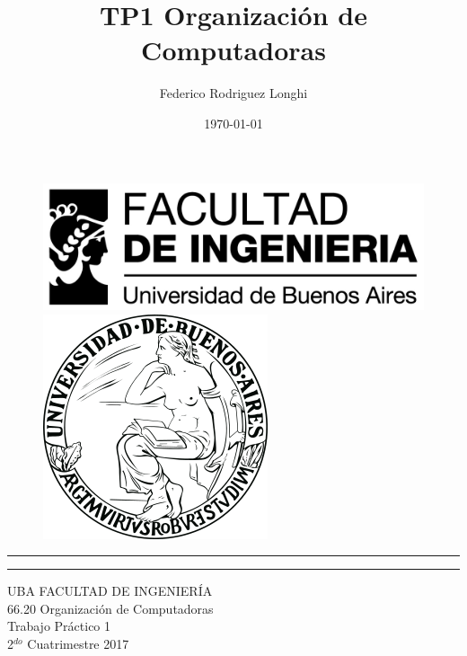 \documentclass[11pt,a4paper]{article}
\begin{document}
\title{TP1 Organización de Computadoras}
\author{Federico Rodriguez Longhi}		
\date{\today}

\begin{titlepage}
	
	\begin{figure}[H]
		\raggedright
		\includegraphics[scale=0.25]{logo_fiuba2}
		\hfill
		\raggedleft
		\includegraphics[scale=0.2]{logo_uba}
	\end{figure}
	\rule{\textwidth}{1pt}\par %
	\vspace{2pt}\vspace{-\baselineskip} %
	\rule{\textwidth}{0.4pt}\par %
	
	\vspace{0.05\textheight} %
	\centering %
	{\Huge UBA FACULTAD DE INGENIERÍA}\\[0.5\baselineskip]
	{\Large 66.20 Organización de Computadoras}\\[0.5\baselineskip]
	{\Huge Trabajo Práctico 1}\\[0.75\baselineskip]
	{\Large 2$^{do}$ Cuatrimestre 2017}\\[0.5\baselineskip]
	\vspace{0.2\textheight}



\end{titlepage}
\end{document}
